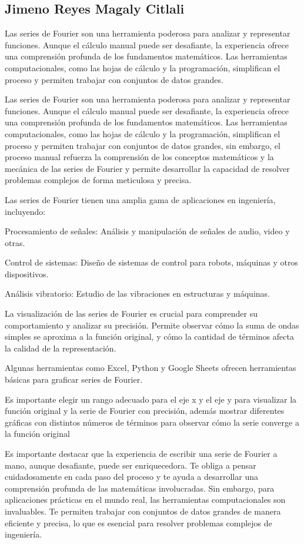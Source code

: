 \subsection{Jimeno Reyes Magaly Citlali }

Las series de Fourier son una herramienta poderosa para analizar y representar funciones. Aunque el cálculo manual puede ser desafiante, la experiencia ofrece una comprensión profunda de los fundamentos matemáticos. Las herramientas computacionales, como las hojas de cálculo y la programación, simplifican el proceso y permiten trabajar con conjuntos de datos grandes.

Las series de Fourier son una herramienta poderosa para analizar y representar funciones. Aunque el cálculo manual puede ser desafiante, la experiencia ofrece una comprensión profunda de los fundamentos matemáticos. Las herramientas computacionales, como las hojas de cálculo y la programación, simplifican el proceso y permiten trabajar con conjuntos de datos grandes, sin embargo, el proceso manual refuerza la comprensión de los conceptos matemáticos y la mecánica de las series de Fourier y permite desarrollar la capacidad de resolver problemas complejos de forma meticulosa y precisa.

Las series de Fourier tienen una amplia gama de aplicaciones en ingeniería, incluyendo:

Procesamiento de señales: Análisis y manipulación de señales de audio, video y otras.

Control de sistemas: Diseño de sistemas de control para robots, máquinas y otros dispositivos.

Análisis vibratorio: Estudio de las vibraciones en estructuras y máquinas.

La visualización de las series de Fourier es crucial para comprender su comportamiento y analizar su precisión. Permite observar cómo la suma de ondas simples se aproxima a la función original, y cómo la cantidad de términos afecta la calidad de la representación.

Algunas herramientas como Excel, Python y Google Sheets ofrecen herramientas básicas para graficar series de Fourier.

Es importante elegir un rango adecuado para el eje x y el eje y para visualizar la función original y la serie de Fourier con precisión, además mostrar diferentes gráficas con distintos números de términos para observar cómo la serie converge a la función original

Es importante destacar que la experiencia de escribir una serie de Fourier a mano, aunque desafiante, puede ser enriquecedora. Te obliga a pensar cuidadosamente en cada paso del proceso y te ayuda a desarrollar una comprensión profunda de las matemáticas involucradas. Sin embargo, para aplicaciones prácticas en el mundo real, las herramientas computacionales son invaluables. Te permiten trabajar con conjuntos de datos grandes de manera eficiente y precisa, lo que es esencial para resolver problemas complejos de ingeniería.

